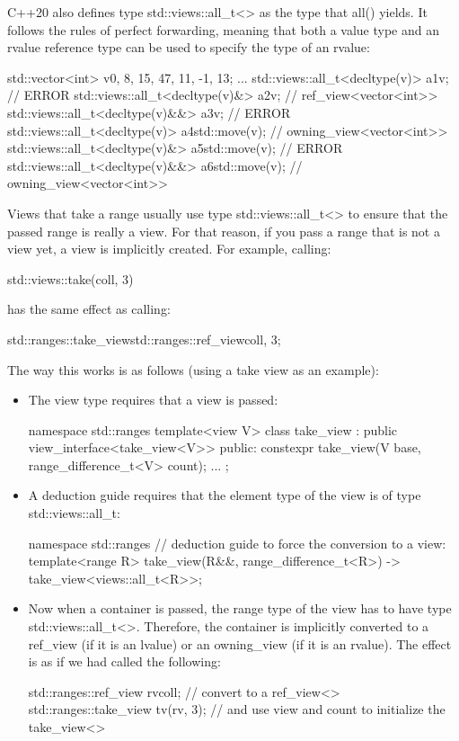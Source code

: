 C++20 also defines type std::views::all\_t<> as the type that all() yields. It follows the rules of perfect forwarding, meaning that both a value type and an rvalue reference type can be used to specify the type of an rvalue:

\begin{cpp}
std::vector<int> v{0, 8, 15, 47, 11, -1, 13};
...
std::views::all_t<decltype(v)> a1{v}; // ERROR
std::views::all_t<decltype(v)&> a2{v}; // ref_view<vector<int>>
std::views::all_t<decltype(v)&&> a3{v}; // ERROR
std::views::all_t<decltype(v)> a4{std::move(v)}; // owning_view<vector<int>>
std::views::all_t<decltype(v)&> a5{std::move(v)}; // ERROR
std::views::all_t<decltype(v)&&> a6{std::move(v)}; // owning_view<vector<int>>
\end{cpp}

Views that take a range usually use type std::views::all\_t<> to ensure that the passed range is really a view. For that reason, if you pass a range that is not a view yet, a view is implicitly created. For example, calling:

\begin{cpp}
std::views::take(coll, 3)
\end{cpp}

has the same effect as calling:

\begin{cpp}
std::ranges::take_view{std::ranges::ref_view{coll}, 3};
\end{cpp}

The way this works is as follows (using a take view as an example):

\begin{itemize}
\item
The view type requires that a view is passed:

\begin{cpp}
namespace std::ranges {
	template<view V>
	class take_view : public view_interface<take_view<V>> {
		public:
		constexpr take_view(V base, range_difference_t<V> count);
		...
	};
}
\end{cpp}

\item
A deduction guide requires that the element type of the view is of type std::views::all\_t:

\begin{cpp}
namespace std::ranges {
	// deduction guide to force the conversion to a view:
	template<range R>
	take_view(R&&, range_difference_t<R>) -> take_view<views::all_t<R>>;
}
\end{cpp}

\item
Now when a container is passed, the range type of the view has to have type std::views::all\_t<>. Therefore, the container is implicitly converted to a ref\_view (if it is an lvalue) or an owning\_view (if it is an rvalue). The effect is as if we had called the following:

\begin{cpp}
std::ranges::ref_view rv{coll}; // convert to a ref_view<>
std::ranges::take_view tv(rv, 3); // and use view and count to initialize the take_view<>
\end{cpp}
\end{itemize}

